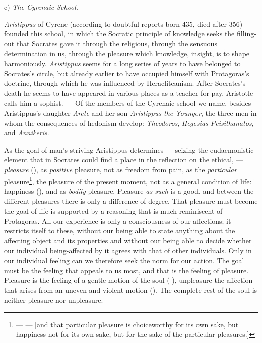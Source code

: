 \begin{center}
c) \emph{The Cyrenaic School.}
\end{center}

\emph{Aristippus} of Cyrene (according to doubtful reports born
435, died after 356) founded this school, in which the Socratic principle of knowledge seeks the filling-out that Socrates gave
it through the religious, through the sensuous determination
in us, through the pleasure which knowledge, insight, is to shape
\setcounter{footnote}{0}harmoniously. \emph{Aristippus} seems for a long series of years to have
belonged to Socrates's circle, but already earlier to
have occupied himself with Protagoras's doctrine, through which
he was influenced by Heracliteanism. After Socrates's death he seems
to have appeared in various places as a teacher for
pay. Aristotle calls him a sophist. --- Of the members of the Cyrenaic school we name, besides Aristippus's daughter
\emph{Arete} and her son \emph{Aristippus the Younger}, the three
men in whom the consequences of hedonism develop:
\emph{Theodoros}, \emph{Hegesias Peisithanatos}, and \emph{Annikeris}.

As the goal of man's striving Aristippus determines
--- seizing the eudaemonistic element that in Socrates
could find a place in the reflection on the ethical, ---
\emph{pleasure} (), as \emph{positive} pleasure, not as freedom from
pain, as the \emph{particular} pleasure\footnote{--- ---  [and that particular pleasure is choiceworthy for its own sake, but happiness not for its own sake, but for the sake of the particular pleasures.]}, the pleasure of the present
moment, not as a general condition of life: happiness (),
and as \emph{bodily} pleasure. Pleasure \emph{as such} is a good,
and between the different pleasures there is only a difference of degree.
That pleasure must become the goal of life is supported by a reasoning that is much reminiscent of Protagoras. All our experience
is only a consciousness of our affections; it restricts
itself to these, without our being able to state anything about the affecting
object and its properties and without our being able to decide
whether our individual being-affected by it agrees with that of other
individuals. Only in our individual feeling can we therefore seek the norm for our action. The goal must be the
feeling that appeals to us most, and that is the feeling of pleasure.
Pleasure is the feeling of a gentle motion of the soul (
), unpleasure the affection that arises from an uneven and
violent motion (). The complete
rest of the soul is neither pleasure nor unpleasure.

